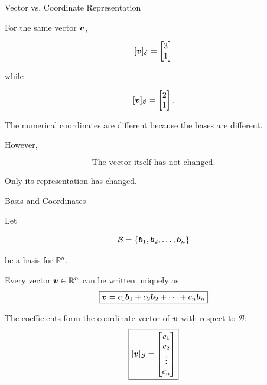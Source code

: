 \begin{frame}{Vector vs. Coordinate Representation}

For the same vector $\bm{v}$,

\[
[\bm{v}]_{\mathcal{E}}
=
\begin{bmatrix}
3\\1
\end{bmatrix}
\]

while

\[
[\bm{v}]_{\mathcal{B}}
=
\begin{bmatrix}
2\\1
\end{bmatrix}.
\]

The numerical coordinates are different because the bases
are different.

\vspace{0.4cm}

However,

\[
\boxed{
\text{The vector itself has not changed.}
}
\]

Only its representation has changed.

\end{frame}



\begin{frame}{Basis and Coordinates}

Let

\[
\mathcal{B}
=
\{\bm{b}_1,\bm{b}_2,\ldots,\bm{b}_n\}
\]

be a basis for $\mathbb{R}^n$.

\vspace{0.1cm}

Every vector $\bm{v}\in\mathbb{R}^n$ can be written uniquely as
\vspace{-0.1cm}
\[
\boxed{
\bm{v}
=
c_1\bm{b}_1
+
c_2\bm{b}_2
+
\cdots
+
c_n\bm{b}_n
}
\]

\vspace{0.1cm}

The coefficients form the coordinate vector of $\bm{v}$
with respect to $\mathcal{B}$:
\vspace{-0.1cm}
\[
\boxed{
[\bm{v}]_{\mathcal{B}}
=
\begin{bmatrix}
c_1\\
c_2\\
\vdots\\
c_n
\end{bmatrix}
}
\]

\end{frame}

